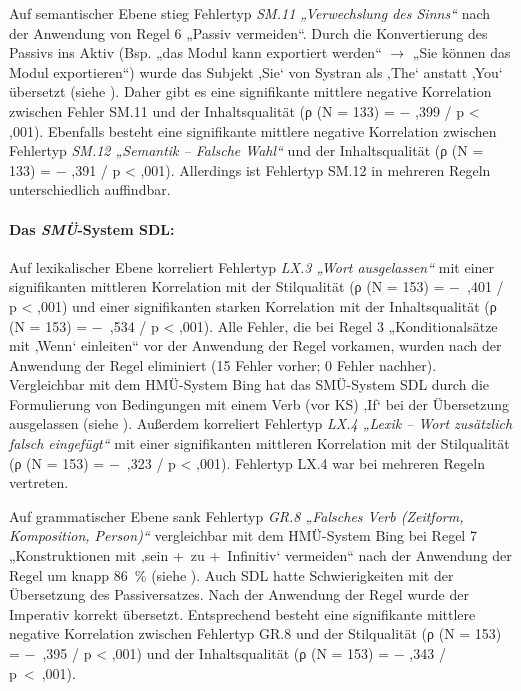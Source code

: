 Auf semantischer Ebene stieg Fehlertyp \textit{SM.11 „Verwechslung des Sinns“} nach der Anwendung von Regel 6 „Passiv vermeiden“. Durch die Konvertierung des Passivs ins Aktiv (Bsp. „das Modul kann exportiert werden“ $\to$ „Sie können das Modul exportieren“) wurde das Subjekt ‚Sie‘ von Systran als ‚The‘ anstatt ‚You‘ übersetzt (siehe ). Daher gibt es eine signifikante mittlere negative Korrelation zwischen Fehler SM.11 und der Inhaltsqualität (ρ (N = 133) = $-$ ,399 / p < ,001). Ebenfalls besteht eine signifikante mittlere negative Korrelation zwischen Fehlertyp \textit{SM.12 „Semantik -- Falsche Wahl“} und der Inhaltsqualität (ρ (N = 133) = $-$ ,391 / p < ,001). Allerdings ist Fehlertyp SM.12 in mehreren Regeln unterschiedlich auffindbar.

\paragraph*{Das \textit{SMÜ}{}-System SDL:}
Auf lexikalischer Ebene korreliert Fehlertyp \textit{LX.3 „Wort ausgelassen“} mit einer signifikanten mittleren Korrelation mit der Stilqualität (ρ (N = 153) = $-$~,401 / p < ,001) und einer signifikanten starken Korrelation mit der Inhaltsqualität (ρ (N = 153) = $-$~,534 / p < ,001). Alle Fehler, die bei Regel 3 „Konditionalsätze mit ‚Wenn‘ einleiten“ vor der Anwendung der Regel vorkamen, wurden nach der Anwendung der Regel eliminiert (15 Fehler vorher; 0 Fehler nachher). Vergleichbar mit dem HMÜ-System Bing hat das SMÜ-System SDL durch die Formulierung von Bedingungen mit einem Verb (vor KS) ‚If‘ bei der Übersetzung ausgelassen (siehe ). Außerdem korreliert Fehlertyp \textit{LX.4 „Lexik -- Wort zusätzlich falsch eingefügt“} mit einer signifikanten mittleren Korrelation mit der Stilqualität (ρ (N = 153) = $-$~,323 / p < ,001). Fehlertyp LX.4 war bei mehreren Regeln vertreten.

Auf grammatischer Ebene sank Fehlertyp \textit{GR.8 „Falsches Verb (Zeitform, Komposition, Person)“} vergleichbar mit dem HMÜ-System Bing bei Regel 7 „Konstruktionen mit ‚sein +~zu +~Infinitiv‘ vermeiden“ nach der Anwendung der Regel um knapp 86~\% (siehe ). Auch SDL hatte Schwierigkeiten mit der Übersetzung des Passiversatzes. Nach der Anwendung der Regel wurde der Imperativ korrekt übersetzt. Entsprechend besteht eine signifikante mittlere negative Korrelation zwischen Fehlertyp GR.8 und der Stilqualität (ρ (N = 153) = $-$~,395 / p < ,001) und der Inhaltsqualität (ρ (N = 153) = $-$ ,343 / p~<~,001).

